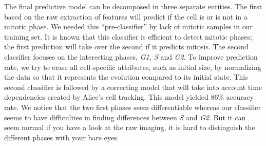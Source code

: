 \documentclass{article}
\begin{document}
The final predictive model can be decomposed in three separate entities. The first based on the raw extraction of features will predict if the cell is or is not in a mitotic phase. We needed this “pre-classifier” by lack of mitotic samples in our training set. It is known that this classifier is efficient to detect mitotic phases; the first prediction will take over the second if it predicts mitosis.  The second classifier focuses on the interesting phases, \textit{G1, S} and \textit{G2}. To improve prediction rate, we try to erase all cell-specific attributes, such as initial size, by normalizing the data so that it represents the evolution compared to its initial state. This second classifier is followed by a correcting model that will take into account time dependencies created by Alice's cell tracking. This model yielded 86\% accuracy rate. We notice that the two first phases seem differentiable whereas our classifier seems to have difficulties in finding differences between \textit{S} and \textit{G2}. But it can seem normal if you have a look at the raw imaging, it is hard to distinguish the different phases with your bare eyes.

\bigskip
\end{document}
